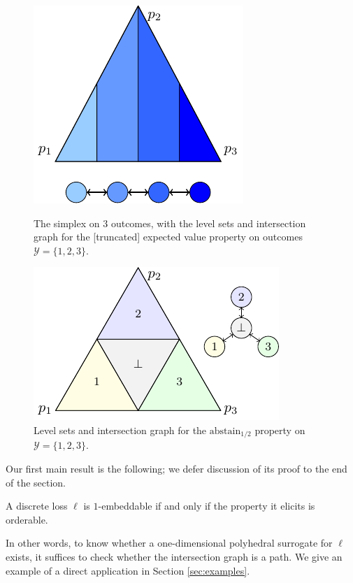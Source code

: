 \documentclass[anon]{colt2020} %
\newcommand{\abstain}[1]{\mathrm{abstain}_{#1}}
\newcommand{\Y}{\mathcal{Y}}
\begin{document}
\begin{figure}
	\begin{minipage}{0.48\linewidth}
	\centering
	\includegraphics[width = 0.8\linewidth]{tikz/intersection-graph.pdf}
	\caption{The simplex on $3$ outcomes, with the level sets and intersection graph for the [truncated] expected value property on outcomes $\Y = \{1,2,3\}$.}
	\label{fig:intersection-graph-ex}
	\end{minipage}
\hfill
	\begin{minipage}{0.48\linewidth}
	\centering
	\includegraphics[width = 0.9\linewidth]{tikz/abstain-alpha-half.pdf}
	\caption{Level sets and intersection graph for the $\abstain{1/2}$ property on $\Y = \{1,2,3\}$.}
	\label{fig:abstain-alpha-half}
\end{minipage}
\end{figure}

Our first main result is the following; we defer discussion of its proof to the end of the section.
\begin{theorem} \label{thm:orderable-iff-1d}
  A discrete loss $\ell$ is $1$-embeddable if and only if the property it elicits is orderable.
\end{theorem}
In other words, to know whether a one-dimensional polyhedral surrogate for $\ell$ exists, it suffices to check whether the intersection graph is a path.
We give an example of a direct application in Section \ref{sec:examples}.
\end{document}
